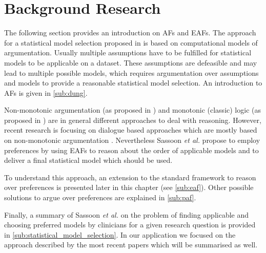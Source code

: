 \section{Background Research}
\label{sec:background}


The following section provides an introduction on \glspl{AF} and \glspl{EAF}. The approach for a statistical model selection proposed in \cite{sassoon2014} is based on computational models of argumentation. Usually multiple assumptions have to be fulfilled for statistical models to be applicable on a dataset. These assumptions are defeasible and may lead to multiple possible models, which requires argumentation over assumptions and models to provide a reasonable statistical model selection. An introduction to \glspl{AF} is given in \autoref{sub:dung}. 

Non-monotonic argumentation (as proposed in \cite{liao,dung1995}) and monotonic (classic) logic (as proposed in \cite{Reiter1980}) are in general different approaches to deal with reasoning. However, recent research is focusing on dialogue based approaches which are mostly based on non-monotonic argumentation \cite{parsons2000,Walton1995}. 
Nevertheless Sassoon \textit{et al.} propose to employ preferences by using \glspl{EAF} to reason about the order of applicable models and to deliver a final statistical model which should be used. 

To understand this approach, an extension to the standard framework to reason over preferences is presented later in this chapter (see \autoref{sub:eaf}). Other possible solutions to argue over preferences are explained in \autoref{sub:paf}.

Finally, a summary of Sassoon \textit{et al.} \cite{sassoon2014} on the problem of finding applicable and choosing preferred models by clinicians for a given research question is provided in \autoref{sub:statistical_model_selection}. In our application we focused on the approach described by the most recent papers \cite{sassoon2016,sassoon2016CD} which will be summarised as well.







% 
